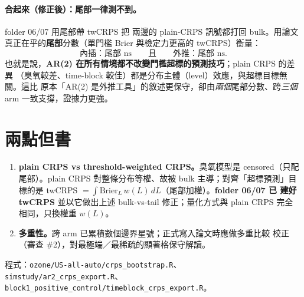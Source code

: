\documentclass[12pt]{article}
\begin{document}
\paragraph{合起來（修正後）：尾部一律測不到。}folder 06/07 用尾部帶 twCRPS 把
兩邊的 plain-CRPS 訊號都打回 bulk。用論文真正在乎的\textbf{尾部}分數（單門檻
Brier 與檢定力更高的 twCRPS）衡量：
\[
  \text{內插：尾部 ns} \qquad\text{且}\qquad \text{外推：尾部 ns.}
\]
也就是說，\textbf{AR(2) 在所有情境都不改變門檻超標的預測技巧}；plain CRPS 的差異
（臭氧較差、time-block 較佳）都是分布主體（level）效應，與超標目標無關。這比
原本「AR(2) 是外推工具」的敘述更保守，卻由\emph{兩個}尾部分數、跨\emph{三個}
arm 一致支撐，證據力更強。

\section*{兩點但書}

\begin{enumerate}
  \item \textbf{plain CRPS vs threshold-weighted CRPS。}臭氧模型是 censored（只配
        尾部）。plain CRPS 對整條分布等權、故被 bulk 主導；對齊「超標預測」目標的是
        twCRPS $=\int \mathrm{Brier}_L\,w(L)\,dL$（尾部加權）。\textbf{folder 06/07 已
        建好 twCRPS} 並以它做出上述 bulk-vs-tail 修正；量化方式與 plain CRPS 完全
        相同，只換權重 $w(L)$。
  \item \textbf{多重性。}跨 arm 已累積數個邊界星號；正式寫入論文時應做多重比較
        校正（審查 \#2），對最極端／最稀疏的顯著格保守解讀。
\end{enumerate}

\medskip
\noindent\footnotesize 程式：\verb|ozone/US-all-auto/crps_bootstrap.R|、
\verb|simstudy/ar2_crps_export.R|、
\verb|block1_positive_control/timeblock_crps_export.R|。
\end{document}
